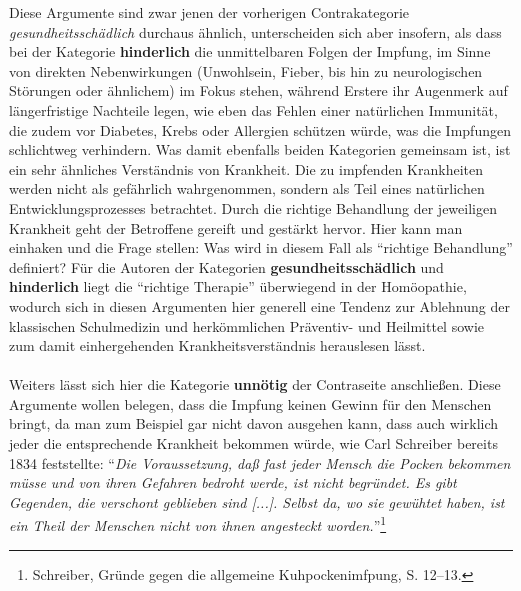 \documentclass[
    a4paper,
    12pt,
    hyphens,
    chapterprefix=true,
    headheight=33pt,
    footheight=29pt,
    headings=optiontohead, %
]{scrartcl}
\begin{document}
{Diese Argumente sind zwar jenen der vorherigen Contrakategorie \textit{gesundheitsschädlich} durchaus ähnlich, unterscheiden sich aber insofern, als dass bei der Kategorie \textbf{hinderlich} die unmittelbaren Folgen der Impfung, im Sinne von direkten Nebenwirkungen (Unwohlsein, Fieber, bis hin zu neurologischen Störungen oder ähnlichem) im Fokus stehen, während Erstere ihr Augenmerk auf längerfristige Nachteile legen, wie eben das Fehlen einer natürlichen Immunität, die zudem vor Diabetes, Krebs oder Allergien schützen würde, was die Impfungen schlichtweg verhindern. Was damit ebenfalls beiden Kategorien gemeinsam ist, ist ein sehr ähnliches Verständnis von Krankheit. Die zu impfenden Krankheiten werden nicht als gefährlich wahrgenommen, sondern als Teil eines natürlichen Entwicklungsprozesses betrachtet. Durch die richtige Behandlung der jeweiligen Krankheit geht der Betroffene gereift und gestärkt hervor. Hier kann man einhaken und die Frage stellen: Was wird in diesem Fall als "`richtige Behandlung"' definiert? Für die Autoren der Kategorien \textbf{gesundheitsschädlich} und \textbf{hinderlich} liegt die "`richtige Therapie"' überwiegend in der Homöopathie, wodurch sich in diesen Argumenten hier generell eine Tendenz zur Ablehnung der klassischen Schulmedizin und herkömmlichen Präventiv- und Heilmittel sowie zum damit einhergehenden Krankheitsverständnis herauslesen lässt.\\
\\
Weiters lässt sich hier die Kategorie \textbf{unnötig} der Contraseite anschließen. Diese Argumente wollen belegen, dass die Impfung keinen Gewinn für den Menschen bringt, da man zum Beispiel gar nicht davon ausgehen kann, dass auch wirklich jeder die entsprechende Krankheit bekommen würde, wie Carl Schreiber bereits 1834 feststellte: "`\textit{Die Voraussetzung, daß fast jeder Mensch die Pocken bekommen müsse und von ihren Gefahren bedroht werde, ist nicht begründet. Es gibt Gegenden, die verschont geblieben sind [...]. Selbst da, wo sie gewühtet haben, ist ein Theil der Menschen nicht von ihnen angesteckt worden.}"'\footnote{Schreiber, Gründe gegen die allgemeine Kuhpockenimfpung,  S. 12--13.}\\
}
\end{document}

